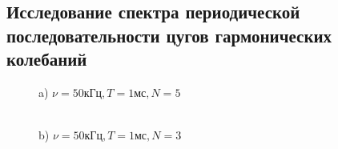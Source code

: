 \documentclass[a4paper,12pt]{article} %
\begin{document}
\subsection*{Исследование спектра периодической последовательности цугов гармонических колебаний}

\begin{figure}[h!]
\begin{minipage}[h!]{0.47\linewidth}
 a) $\nu = 50 кГц, T = 1 мс, N = 5$\\
\end{minipage}
\hfill
\begin{minipage}[h!]{0.47\linewidth}
 \\b) $\nu = 50 кГц, T = 1 мс, N = 3$

\end{minipage}
\end{figure}
\end{document}
